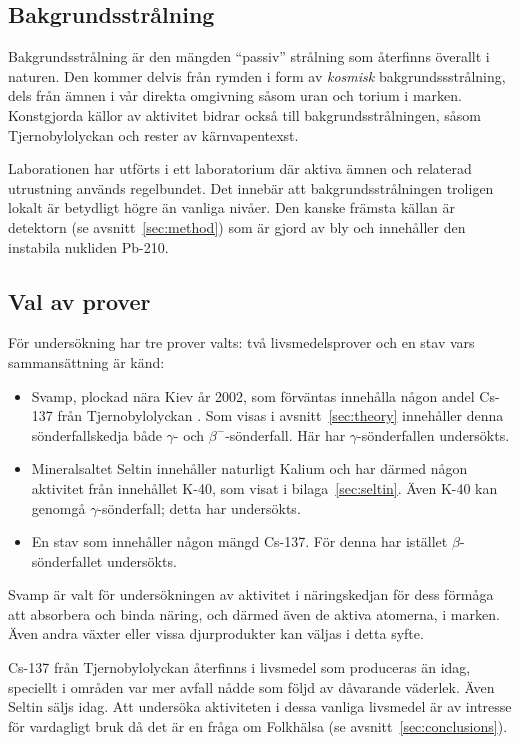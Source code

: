 \subsection{Bakgrundsstrålning} \label{sec:backgroundrad}

Bakgrundsstrålning är den mängden ``passiv'' strålning som återfinns överallt i
naturen. Den kommer delvis från rymden i form av \textit{kosmisk}
bakgrundssstrålning, dels från ämnen i vår direkta omgivning såsom uran och
torium i marken. Konstgjorda källor av aktivitet bidrar också till
bakgrundsstrålningen, såsom Tjernobylolyckan och rester av kärnvapentexst.

Laborationen har utförts i ett laboratorium där aktiva ämnen och relaterad
utrustning används regelbundet. Det innebär att bakgrundsstrålningen troligen
lokalt är betydligt högre än vanliga nivåer. Den kanske främsta källan är
detektorn (se avsnitt~\ref{sec:method}) som är gjord av bly och innehåller
den instabila nukliden Pb-210.

\subsection{Val av prover} \label{sec:samples}

För undersökning har tre prover valts: två livsmedelsprover och en stav vars 
sammansättning är känd:

\begin{itemize}
    \item Svamp, plockad nära Kiev år 2002, som förväntas innehålla någon
    andel Cs-137 från Tjernobylolyckan \parencite{instructions}. Som visas i
    avsnitt~\ref{sec:theory} innehåller denna sönderfallskedja både
    $\gamma$- och $\beta^-$-sönderfall. Här har $\gamma$-sönderfallen
    undersökts.

    \item Mineralsaltet Seltin innehåller naturligt Kalium och har därmed
    någon aktivitet från innehållet K-40, som visat i bilaga~\ref{sec:seltin}.
    Även K-40 kan genomgå $\gamma$-sönderfall; detta har undersökts.

    \item En stav som innehåller någon mängd Cs-137. För denna har istället
    $\beta$-sönderfallet undersökts.
\end{itemize}

Svamp är valt för undersökningen av aktivitet i näringskedjan för dess förmåga
att absorbera och binda näring, och därmed även de aktiva atomerna, i marken.
Även andra växter eller vissa djurprodukter kan väljas i detta syfte.

Cs-137 från Tjernobylolyckan återfinns i livsmedel som produceras än idag,
speciellt i områden var mer avfall nådde som följd av dåvarande väderlek. Även
Seltin säljs idag. Att undersöka aktiviteten i dessa vanliga livsmedel är av
intresse för vardagligt bruk då det är en fråga om Folkhälsa
(se avsnitt~\ref{sec:conclusions}).
